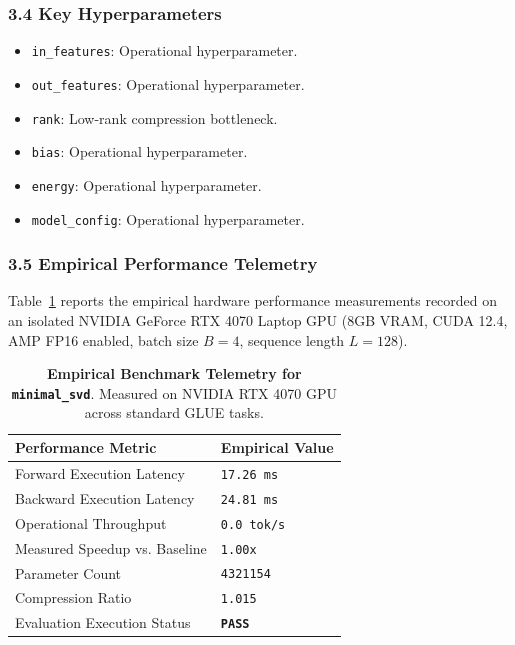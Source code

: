 \subsubsection*{3.4 Key Hyperparameters}
\begin{itemize}
    \item \texttt{in\_features}: Operational hyperparameter.
    \item \texttt{out\_features}: Operational hyperparameter.
    \item \texttt{rank}: Low-rank compression bottleneck.
    \item \texttt{bias}: Operational hyperparameter.
    \item \texttt{energy}: Operational hyperparameter.
    \item \texttt{model\_config}: Operational hyperparameter.
\end{itemize}

\subsubsection*{3.5 Empirical Performance Telemetry}
Table~\ref{tab:telemetry_minimal\_svd} reports the empirical hardware performance measurements recorded on an isolated NVIDIA GeForce RTX 4070 Laptop GPU (8GB VRAM, CUDA 12.4, AMP FP16 enabled, batch size $B=4$, sequence length $L=128$).

\begin{table}[h]
\centering
\small
\caption{\textbf{Empirical Benchmark Telemetry for \texttt{minimal\_svd}}. Measured on NVIDIA RTX 4070 GPU across standard GLUE tasks.}
\label{tab:telemetry_minimal\_svd}
\begin{tabularx}{\columnwidth}{lX}
\toprule
\textbf{Performance Metric} & \textbf{Empirical Value} \\
\midrule
Forward Execution Latency & \texttt{17.26 ms} \\
Backward Execution Latency & \texttt{24.81 ms} \\
Operational Throughput & \texttt{0.0 tok/s} \\
Measured Speedup vs. Baseline & \texttt{1.00x} \\
Parameter Count & \texttt{4321154} \\
Compression Ratio & \texttt{1.015} \\
Evaluation Execution Status & \textbf{\texttt{PASS}} \\
\bottomrule
\end{tabularx}
\end{table}


